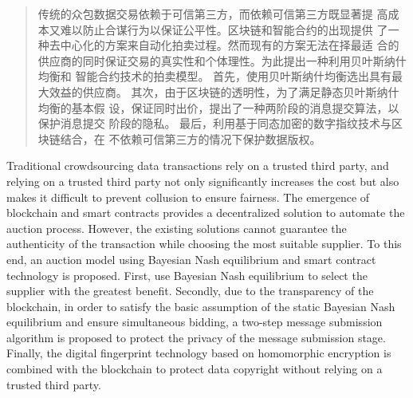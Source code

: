 

\begin{abstract}

  传统的众包数据交易依赖于可信第三方，而依赖可信第三方既显著提
  高成本又难以防止合谋行为以保证公平性。区块链和智能合约的出现提供
  了一种去中心化的方案来自动化拍卖过程。然而现有的方案无法在择最适
  合的供应商的同时保证交易的真实性和个体理性。为此提出一种利用贝叶斯纳什均衡和
  智能合约技术的拍卖模型。
  首先，使用贝叶斯纳什均衡选出具有最大效益的供应商。
  其次，由于区块链的透明性，为了满足静态贝叶斯纳什均衡的基本假
  设，保证同时出价，提出了一种两阶段的消息提交算法，以保护消息提交
  阶段的隐私。
  最后，利用基于同态加密的数字指纹技术与区块链结合，在
  不依赖可信第三方的情况下保护数据版权。
\end{abstract}

\begin{abstract*}

Traditional crowdsourcing data transactions rely on a trusted third party, 
and relying on a trusted third party not only significantly increases the cost
but also makes it difficult to prevent collusion to ensure fairness. The emergence
of blockchain and smart contracts provides a decentralized solution to automate
the auction process. However, the existing solutions cannot guarantee the
authenticity of the transaction while choosing the most suitable supplier.
To this end, an auction model using Bayesian Nash equilibrium and smart contract
technology is proposed. First, use Bayesian Nash equilibrium to select the supplier
with the greatest benefit. Secondly, due to the transparency of the blockchain,
in order to satisfy the basic assumption of the static Bayesian Nash equilibrium and 
ensure simultaneous bidding, a two-step message submission algorithm is proposed 
to protect the privacy of the message submission stage. Finally, the digital 
fingerprint technology based on homomorphic encryption is combined with the 
blockchain to protect data copyright without relying on a trusted third party.
\end{abstract*}
